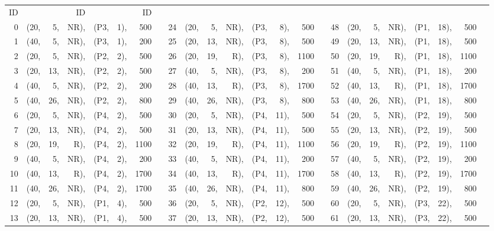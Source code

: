 \begin{table}
\begin{center}
\begin{scriptsize}
\begin{tabular}{*{3}{@{\hskip15pt}r|*{5}{r@{\hskip3pt}}rc}}
	ID&&&ID&&&ID&\\
													 													
   0&(20,& 5,&NR),&(P3,& 1),& 500&	& 	    24&(20,& 5,&NR),&(P3,& 8),& 500&  &     48&(20,& 5,&NR),&(P1,&18),& 500\\       
   1&(40,& 5,&NR),&(P3,& 1),& 200&  &       25&(20,&13,&NR),&(P3,& 8),& 500&  &     49&(20,&13,&NR),&(P1,&18),& 500\\  
   2&(20,& 5,&NR),&(P2,& 2),& 500&  &       26&(20,&19,& R),&(P3,& 8),&1100&  &     50&(20,&19,& R),&(P1,&18),&1100\\
   3&(20,&13,&NR),&(P2,& 2),& 500&  &       27&(40,& 5,&NR),&(P3,& 8),& 200&  &     51&(40,& 5,&NR),&(P1,&18),& 200\\
   4&(40,& 5,&NR),&(P2,& 2),& 200&  &       28&(40,&13,& R),&(P3,& 8),&1700&  &     52&(40,&13,& R),&(P1,&18),&1700\\
   5&(40,&26,&NR),&(P2,& 2),& 800&  &       29&(40,&26,&NR),&(P3,& 8),& 800&  &     53&(40,&26,&NR),&(P1,&18),& 800\\
   6&(20,& 5,&NR),&(P4,& 2),& 500&  &       30&(20,& 5,&NR),&(P4,&11),& 500&  &     54&(20,& 5,&NR),&(P2,&19),& 500\\
   7&(20,&13,&NR),&(P4,& 2),& 500&  &       31&(20,&13,&NR),&(P4,&11),& 500&  &     55&(20,&13,&NR),&(P2,&19),& 500\\
   8&(20,&19,& R),&(P4,& 2),&1100&  &       32&(20,&19,& R),&(P4,&11),&1100&  &     56&(20,&19,& R),&(P2,&19),&1100\\
   9&(40,& 5,&NR),&(P4,& 2),& 200&  &       33&(40,& 5,&NR),&(P4,&11),& 200&  &     57&(40,& 5,&NR),&(P2,&19),& 200\\
  10&(40,&13,& R),&(P4,& 2),&1700&  &       34&(40,&13,& R),&(P4,&11),&1700&  &     58&(40,&13,& R),&(P2,&19),&1700\\
  11&(40,&26,&NR),&(P4,& 2),&1700&  &       35&(40,&26,&NR),&(P4,&11),& 800&  &     59&(40,&26,&NR),&(P2,&19),& 800\\
  12&(20,& 5,&NR),&(P1,& 4),& 500&  &       36&(20,& 5,&NR),&(P2,&12),& 500&  &     60&(20,& 5,&NR),&(P3,&22),& 500\\
  13&(20,&13,&NR),&(P1,& 4),& 500&  &       37&(20,&13,&NR),&(P2,&12),& 500&  &     61&(20,&13,&NR),&(P3,&22),& 500\\

\end{tabular}
\end{scriptsize}
\end{center}
\end{table}
